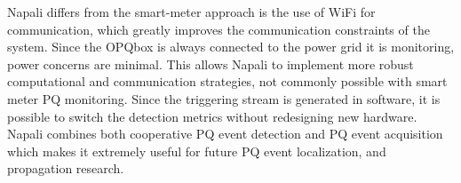 Napali differs from the smart-meter approach is the use of WiFi for communication, which greatly improves the communication constraints of the system. Since the OPQbox is always connected to the power grid it is monitoring, power concerns are minimal. This allows Napali to implement more robust computational and communication strategies, not commonly possible with smart meter PQ monitoring. Since the triggering stream is generated in software, it is possible to switch the detection metrics without redesigning new hardware. Napali combines both cooperative PQ event detection and PQ event acquisition which makes it extremely useful for future PQ event localization, and propagation research. \cite{parsons1998direction} \cite{polajvzer2017evaluation}
